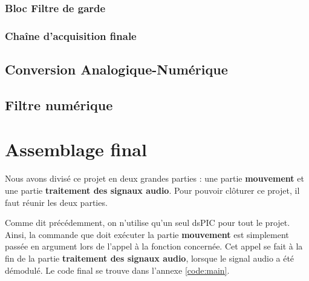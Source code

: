 \documentclass[12pt,a4paper]{ULBReport} %
\begin{document}
\subsection{Bloc Filtre de garde}





\subsection{Chaîne d'acquisition finale}




%

\newpage


\section{Conversion Analogique-Numérique}



\newpage
\section{Filtre numérique}



\newpage
\chapter{Assemblage final}

Nous avons divisé ce projet en deux grandes parties : une partie \textbf{mouvement} et une partie \textbf{traitement des signaux audio}. Pour pouvoir clôturer ce projet, il faut réunir les deux parties.

Comme dit précédemment, on n'utilise qu'un seul dsPIC pour tout le projet. Ainsi, la commande que doit exécuter la partie \textbf{mouvement} est simplement passée en argument lors de l'appel à la fonction concernée. Cet appel se fait à la fin de la partie \textbf{traitement des signaux audio}, lorsque le signal audio a été démodulé. Le code final se trouve dans l'annexe \ref{code:main}.
\end{document}
